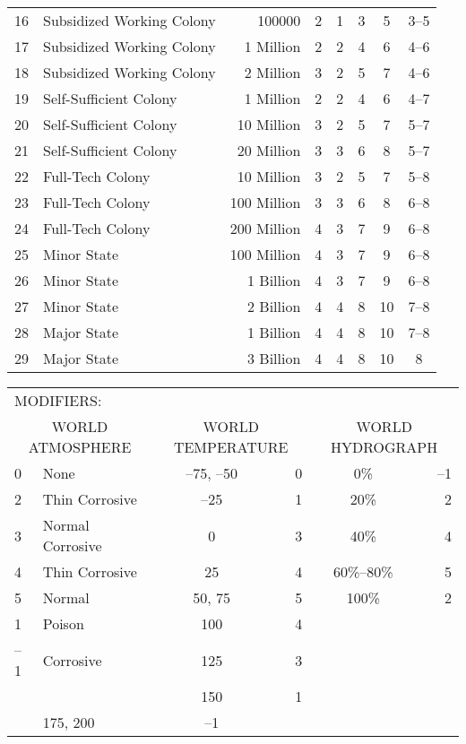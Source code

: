 \begin{table}[htbp]
{\begin{minipage}{0.95\textwidth}
\begin{tabular}{rlrccccc}
        16 & Subsidized Working Colony & 100000 & 2 & 1 & 3 & 5 & 3--5\\
        \rowcolor{grey}
        17 & Subsidized Working Colony & 1 Million & 2 & 2 & 4 & 6 & 4--6\\
        18 & Subsidized Working Colony & 2 Million & 3 & 2 & 5 & 7 & 4--6\\
        \rowcolor{grey}
        19 & Self-Sufficient Colony & 1 Million & 2 & 2 & 4 & 6 & 4--7\\
        20 & Self-Sufficient Colony & 10 Million & 3 & 2 & 5 & 7 & 5--7\\
        \rowcolor{grey}
        21 & Self-Sufficient Colony & 20 Million & 3 & 3 & 6 & 8 & 5--7\\
        22 & Full-Tech Colony & 10 Million & 3 & 2 & 5 & 7 & 5--8\\
        \rowcolor{grey}
        23 & Full-Tech Colony & 100 Million & 3 & 3 & 6 & 8 & 6--8\\
        24 & Full-Tech Colony & 200 Million & 4 & 3 & 7 & 9 & 6--8\\
        \rowcolor{grey}
        25 & Minor State & 100 Million & 4 & 3 & 7 & 9 & 6--8\\
        26 & Minor State & 1 Billion & 4 & 3 & 7 & 9 & 6--8\\
        \rowcolor{grey}
        27 & Minor State & 2 Billion & 4 & 4 & 8 & 10 & 7--8\\
        28 & Major State & 1 Billion & 4 & 4 & 8 & 10 & 7--8\\
        \rowcolor{grey}
        29 & Major State & 3 Billion & 4 & 4 & 8 & 10 & 8\\
      \end{tabular}
      \begin{tabular}{llcrcr}
        \multicolumn{2}{l}{MODIFIERS:}\\
        \multicolumn{2}{c}{WORLD ATMOSPHERE} & \multicolumn{2}{c}{WORLD
          TEMPERATURE} & \multicolumn{2}{c}{WORLD HYDROGRAPH}\\
        \rowcolor{grey}
        0 & None & --75, --50 & 0 & 0\% & --1\\
        2 & Thin Corrosive & --25 & 1 & 20\% & 2\\
        \rowcolor{grey}
        3 & Normal Corrosive & 0 & 3 & 40\% & 4\\
        4 & Thin Corrosive & 25 & 4 & 60\%--80\% & 5\\
        \rowcolor{grey}
        5 & Normal & 50, 75 & 5 & 100\% & 2\\
        1 & Poison & 100 & 4\\
        \rowcolor{grey}
        --1 & Corrosive & 125 & 3\\
        \multicolumn{2}{c}{} & 150 & 1\\
        \rowcolor{grey}
        \multicolumn{2}{c}{} & 175, 200 & --1
      \end{tabular}


\end{minipage}}
\end{table}
